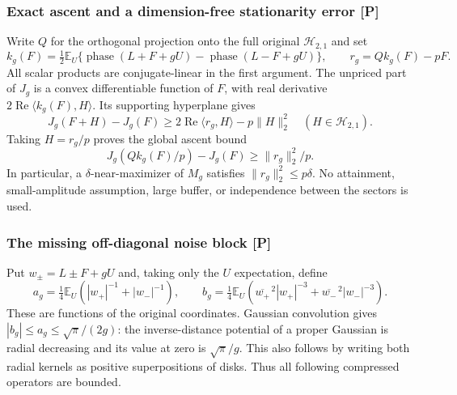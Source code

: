 \subsubsection{Exact ascent and a dimension-free stationarity error [P]}
Write $Q$ for the orthogonal projection onto the full original
$\mathcal H_{2,1}$ and set
\[
 k_g(F)=\tfrac12\mathbb E_U\{\operatorname{phase}(L+F+gU)
                         -\operatorname{phase}(L-F+gU)\},
 \qquad r_g=Qk_g(F)-pF.
\]
All scalar products are conjugate-linear in the first argument. The unpriced
part of $J_g$ is a convex differentiable function of $F$, with real derivative
$2\operatorname{Re}\langle k_g(F),H\rangle$. Its supporting hyperplane gives
\[
 J_g(F+H)-J_g(F)\ge
       2\operatorname{Re}\langle r_g,H\rangle-p\|H\|_2^2
       \quad(H\in\mathcal H_{2,1}).
\]
Taking $H=r_g/p$ proves the global ascent bound
\begin{equation}\label{eq:sg-ascent}
 \boxed{J_g(Qk_g(F)/p)-J_g(F)\ge\|r_g\|_2^2/p.}
\end{equation}
In particular, a $\delta$-near-maximizer of $M_g$ satisfies
$\|r_g\|_2^2\le p\delta$. No attainment, small-amplitude assumption,
large buffer, or independence between the sectors is used.

\subsubsection{The missing off-diagonal noise block [P]}
Put $w_\pm=L\pm F+gU$ and, taking only the $U$ expectation, define
\[
 a_g=\tfrac14\mathbb E_U(|w_+|^{-1}+|w_-|^{-1}),\qquad
 b_g=\tfrac14\mathbb E_U
       (\overline{w_+}^{\,2}|w_+|^{-3}
        +\overline{w_-}^{\,2}|w_-|^{-3}).
\]
These are functions of the original coordinates. Gaussian convolution gives
$|b_g|\le a_g\le\sqrt\pi/(2g)$: the inverse-distance potential of a
proper Gaussian is radial decreasing and its value at zero is $\sqrt\pi/g$.
This also follows by writing both radial kernels as positive superpositions
of disks. Thus all following compressed operators are bounded.

